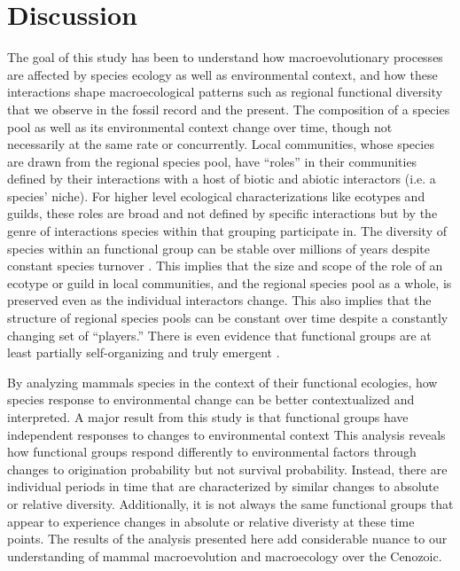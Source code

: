 \documentclass[12pt,letterpaper]{article}
\begin{document}
\section*{Discussion}

The goal of this study has been to understand how macroevolutionary processes are affected by species ecology as well as environmental context, and how these interactions shape macroecological patterns such as regional functional diversity that we observe in the fossil record and the present. The composition of a species pool as well as its environmental context change over time, though not necessarily at the same rate or concurrently. Local communities, whose species are drawn from the regional species pool, have ``roles'' in their communities defined by their interactions with a host of biotic and abiotic interactors (i.e. a species' niche). For higher level ecological characterizations like ecotypes and guilds, these roles are broad and not defined by specific interactions but by the genre of interactions species within that grouping participate in. The diversity of species within an functional group can be stable over millions of years despite constant species turnover \citep{Jernvall2004,Slater2015c,Valkenburgh1999}. This implies that the size and scope of the role of an ecotype or guild in local communities, and the regional species pool as a whole, is preserved even as the individual interactors change. This also implies that the structure of regional species pools can be constant over time despite a constantly changing set of ``players.'' There is even evidence that functional groups are at least partially self-organizing and truly emergent \citep{Scheffer2006a}.

By analyzing mammals species in the context of their functional ecologies, how species response to environmental change can be better contextualized and interpreted. A major result from this study is that functional groups have independent responses to changes to environmental context
This analysis reveals how functional groups respond differently to environmental factors through changes to origination probability but not survival probability. Instead, there are individual periods in time that are characterized by similar changes to absolute or relative diversity. Additionally, it is not always the same functional groups that appear to experience changes in absolute or relative diveristy at these time points. The results of the analysis presented here add considerable nuance to our understanding of mammal macroevolution and macroecology over the Cenozoic. 
\end{document}
